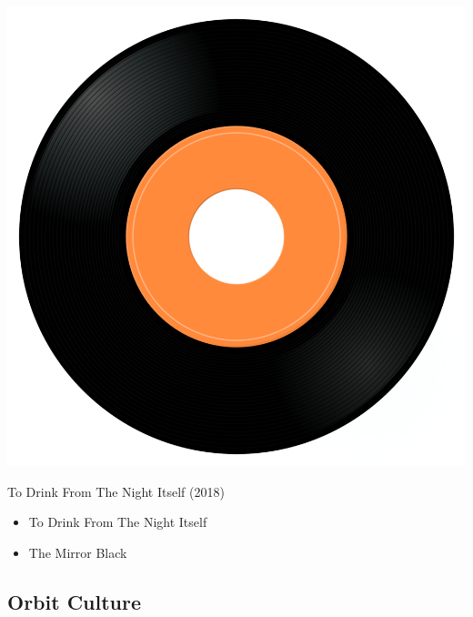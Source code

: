 \begin{minipage}[t]{0.25\textwidth}\vspace{0pt}
\captionsetup{type=figure}
\includegraphics[width=\textwidth]{Images/cover.png}
\caption*{To Drink From The Night Itself (2018)}
\end{minipage}
\begin{minipage}[t]{0.25\textwidth}\vspace{0pt}
\begin{itemize}[nosep,leftmargin=1em,labelwidth=*,align=left]
	\setlength{\itemsep}{0pt}
	\item To Drink From The Night Itself
	\item The Mirror Black
\end{itemize}
\end{minipage}

\subsection{Orbit Culture}

